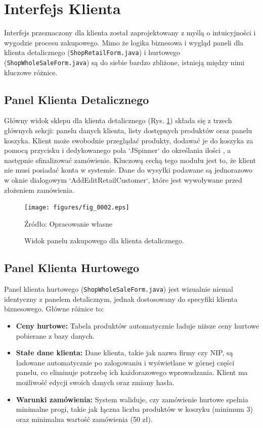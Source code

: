 \section{Interfejs Klienta}
Interfejs przeznaczony dla klienta został zaprojektowany z myślą o intuicyjności i wygodzie procesu zakupowego. Mimo że logika biznesowa i wygląd paneli dla klienta detalicznego (\texttt{ShopRetailForm.java}) i hurtowego (\texttt{ShopWholeSaleForm.java}) są do siebie bardzo zbliżone, istnieją między nimi kluczowe różnice.

\subsection{Panel Klienta Detalicznego}
Główny widok sklepu dla klienta detalicznego (Rys. \ref{fig:shop_retail}) składa się z trzech głównych sekcji: panelu danych klienta, listy dostępnych produktów oraz panelu koszyka. Klient może swobodnie przeglądać produkty, dodawać je do koszyka za pomocą przycisku i dedykowanego pola `JSpinner` do określania ilości , a następnie sfinalizować zamówienie. Kluczową cechą tego modułu jest to, że klient nie musi posiadać konta w systemie. Dane do wysyłki podawane są jednorazowo w oknie dialogowym `AddEditRetailCustomer`, które jest wywoływane przed złożeniem zamówienia.

\begin{figure}[H]
    \centering
    \texttt{[image: figures/fig\_0002.eps]}
    \caption{Widok panelu zakupowego dla klienta detalicznego.}
    \label{fig:shop_retail}
    \small{Źródło: Opracowanie własne}
\end{figure}

\clearpage

\subsection{Panel Klienta Hurtowego}
Panel klienta hurtowego (\texttt{ShopWholeSaleForm.java}) jest wizualnie niemal identyczny z panelem detalicznym, jednak dostosowany do specyfiki klienta biznesowego. Główne różnice to:
\begin{itemize}
    \item \textbf{Ceny hurtowe:} Tabela produktów automatycznie ładuje niższe ceny hurtowe pobierane z bazy danych.
    \item \textbf{Stałe dane klienta:} Dane klienta, takie jak nazwa firmy czy NIP, są ładowane automatycznie po zalogowaniu i wyświetlane w górnej części panelu, co eliminuje potrzebę ich każdorazowego wprowadzania. Klient ma możliwość edycji swoich danych oraz zmiany hasła.
    \item \textbf{Warunki zamówienia:} System waliduje, czy zamówienie hurtowe spełnia minimalne progi, takie jak łączna liczba produktów w koszyku (minimum 3) oraz minimalna wartość zamówienia (50 zł).
\end{itemize}

